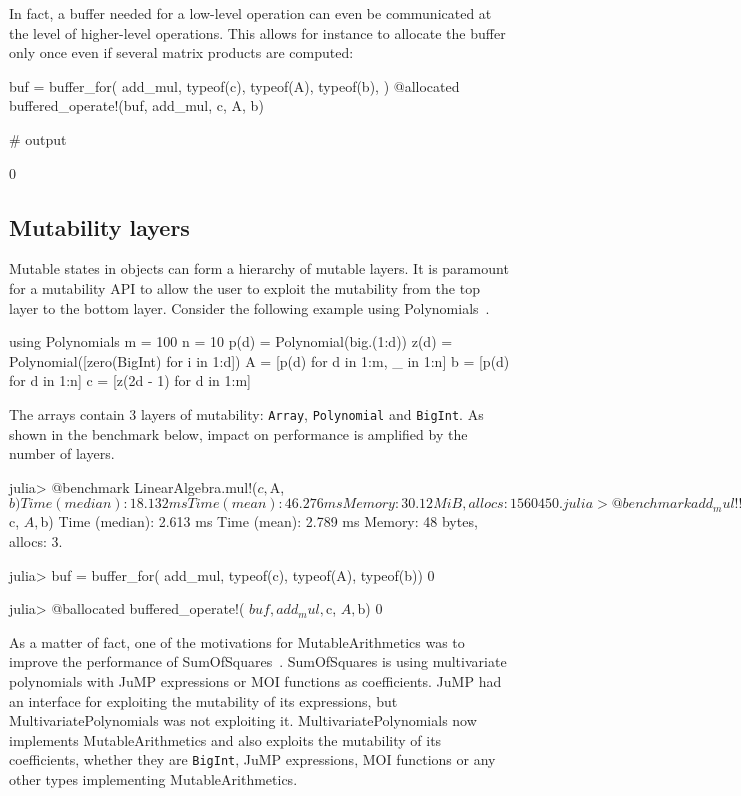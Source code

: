 \documentclass{juliacon}
\newcommand{\ma}{MutableArithmetics}
\begin{document}
In fact, a buffer needed for a low-level operation can even be communicated
at the level of higher-level operations.
This allows for instance to allocate the buffer only once even if
several matrix products are computed:

\begin{jllisting}
buf = buffer_for(
    add_mul,
    typeof(c),
    typeof(A),
    typeof(b),
)
@allocated buffered_operate!(buf, add_mul, c, A, b)

# output

0
\end{jllisting}

\subsection{Mutability layers}
Mutable states in objects can form a hierarchy of mutable layers.
It is paramount for a mutability API to allow the user to exploit
the mutability from the top layer to the bottom layer.
Consider the following example using Polynomials~\cite{verzani2021polynomials}.
\begin{jllisting}
using Polynomials
m = 100
n = 10
p(d) = Polynomial(big.(1:d))
z(d) = Polynomial([zero(BigInt) for i in 1:d])
A = [p(d) for d in 1:m, _ in 1:n]
b = [p(d) for d in 1:n]
c = [z(2d - 1) for d in 1:m]
\end{jllisting}
The arrays contain 3 layers of mutability:
\lstinline|Array|, \lstinline|Polynomial| and \lstinline|BigInt|.
As shown in the benchmark below,
impact on performance is amplified by the number of layers.
\begin{jllisting}
julia> @benchmark LinearAlgebra.mul!($c, $A, $b)
 Time  (median):     18.132 ms
 Time  (mean):       46.276 ms
 Memory: 30.12 MiB, allocs: 1560450.

julia> @benchmark add_mul!!($c, $A, $b)
 Time  (median):     2.613 ms
 Time  (mean):       2.789 ms
 Memory: 48 bytes, allocs: 3.

julia> buf = buffer_for(
    add_mul, typeof(c), typeof(A), typeof(b))
0

julia> @ballocated buffered_operate!(
           $buf, add_mul, $c, $A, $b)
0
\end{jllisting}

As a matter of fact, one of the motivations for \ma{}
was to improve the performance of SumOfSquares~\cite{weisser2019polynomial}.
SumOfSquares is using multivariate polynomials with
JuMP expressions or MOI functions as coefficients.
JuMP had an interface for exploiting the mutability of its expressions,
but MultivariatePolynomials was not exploiting it.
MultivariatePolynomials now implements \ma{}
and also exploits the mutability of its coefficients, whether they are \lstinline|BigInt|, JuMP expressions, MOI functions or any other types implementing \ma{}.
\end{document}
